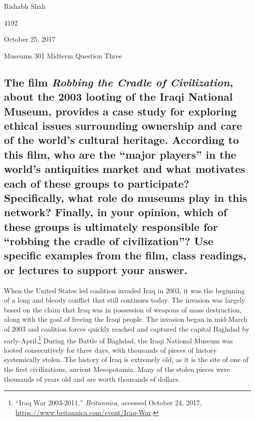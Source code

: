 \documentclass[11pt]{article}
\begin{document}
\singlespacing
{\Large\noindent Rishabh Shah

 4192

\noindent October 25, 2017

\noindent Museums 301 Midterm Question Three}

\subsection*{The film \textit{Robbing the Cradle of Civilization}, about the 2003 looting of the Iraqi National Museum, provides a case study for exploring ethical issues surrounding ownership and care of the world’s cultural heritage. According to this film, who are the ``major players'' in the world’s antiquities market and what motivates each of these groups to participate? Specifically, what role do museums play in this network? Finally, in your opinion, which of these groups is ultimately responsible for ``robbing the cradle of civilization''? Use specific examples from the film, class readings, or lectures to support your answer.}

\doublespacing
When the United States led coalition invaded Iraq in 2003, it was the beginning of a long and bloody conflict that still continues today. The invasion was largely based on the claim that Iraq was in possession of weapons of mass destruction, along with the goal of freeing the Iraqi people. The invasion began in mid-March of 2003 and coalition forces quickly reached and captured the capital Baghdad by early-April.\footnote{``Iraq War 2003-2011,'' \textit{Britannica}, accessed October 24, 2017, \url{https://www.britannica.com/event/Iraq-War}.} During the Battle of Baghdad, the Iraqi National Museum was looted consecutively for three days, with thousands of pieces of history systemically stolen. The history of Iraq is extremely old, as it is the site of one of the first civilizations, ancient Mesopotamia. Many of the stolen pieces were thousands of years old and are worth thousands of dollars. 
\end{document}
